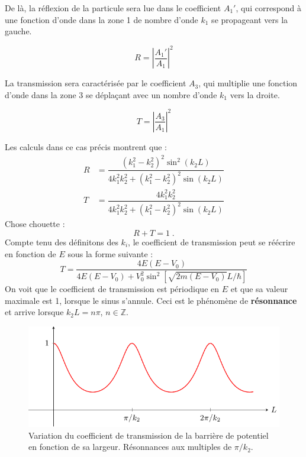 De là, la réflexion de la particule sera lue dans le coefficient $A_1'$, qui correspond à une fonction d'onde dans la zone 1 de nombre d'onde $k_1$ se propageant vers la gauche.

$$ R = \left|\dfrac{A_1'}{A_1}\right|^2$$

La transmission sera caractérisée par le coefficient $A_3$, qui multiplie une fonction d'onde dans la zone 3 se déplaçant avec un nombre d'onde $k_1$ vers la droite.

$$ T = \left|\dfrac{A_3}{A_1}\right|^2$$

Les calculs dans ce cas précis montrent que :
\begin{align}
  R &= \dfrac{(k_1 ^2 - k_2 ^ 2) ^2 \sin^2(k_2 L)}{4k_1 ^2 k_2 ^2 + (k_1 ^2 - k_2 ^ 2) ^2\sin(k_2L)} \\
  T &= \dfrac{4k_1 ^2 k_2 ^2}{4k_1 ^2 k_2 ^2 + (k_1 ^2 - k_2 ^ 2) ^2\sin(k_2L)} 
\end{align}
Chose chouette : 
$$ R + T = 1 \; .$$
Compte tenu des définitons des $k_i$, le coefficient de transmission peut se réécrire en fonction de $E$ sous la forme suivante :
\begin{equation}
  T = \dfrac{4E (E-V_0)}{4E(E-V_0) + V_0 ^2 \sin ^ 2\left[\sqrt{2m(E-V_0)} L/\hbar\right]}
\end{equation}
On voit que le coefficient de transmission est périodique en $E$ et que sa valeur maximale est 1, lorsque le sinus s'annule. Ceci est le phénomène de \textbf{résonnance} et arrive lorsque $k_2L = n\pi$, $n\in \mathbb{Z}$.

\begin{figure}[h]
  \centering
  \includegraphics{images/marche_potentiel_transmission.pdf}
  \caption{Variation du coefficient de transmission de la barrière de potentiel en fonction de sa largeur. Résonnances aux multiples de $\pi/k_2$.}
\end{figure}

